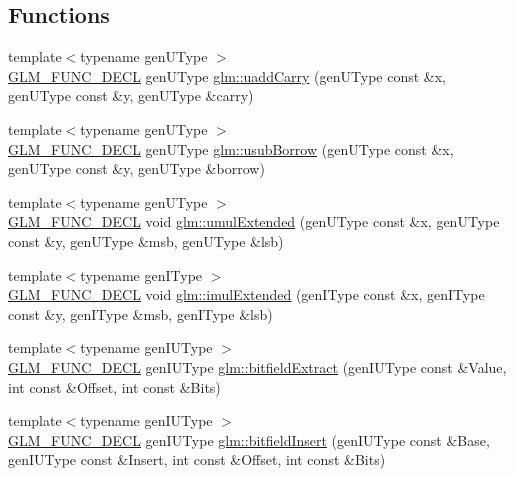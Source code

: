 \subsection*{Functions}
\begin{DoxyCompactItemize}
\item 
{\footnotesize template$<$typename gen\+U\+Type $>$ }\\\hyperlink{setup_8hpp_ab2d052de21a70539923e9bcbf6e83a51}{G\+L\+M\+\_\+\+F\+U\+N\+C\+\_\+\+D\+E\+CL} gen\+U\+Type \hyperlink{group__core__func__integer_ga19276bb7adbe9f0d74515ae49e40b481}{glm\+::uadd\+Carry} (gen\+U\+Type const \&x, gen\+U\+Type const \&y, gen\+U\+Type \&carry)
\item 
{\footnotesize template$<$typename gen\+U\+Type $>$ }\\\hyperlink{setup_8hpp_ab2d052de21a70539923e9bcbf6e83a51}{G\+L\+M\+\_\+\+F\+U\+N\+C\+\_\+\+D\+E\+CL} gen\+U\+Type \hyperlink{group__core__func__integer_gae5b4a6cefd1e21fd2e1b8526b4c964a7}{glm\+::usub\+Borrow} (gen\+U\+Type const \&x, gen\+U\+Type const \&y, gen\+U\+Type \&borrow)
\item 
{\footnotesize template$<$typename gen\+U\+Type $>$ }\\\hyperlink{setup_8hpp_ab2d052de21a70539923e9bcbf6e83a51}{G\+L\+M\+\_\+\+F\+U\+N\+C\+\_\+\+D\+E\+CL} void \hyperlink{group__core__func__integer_gad991bf53779a4309a920bb7bfcf2639c}{glm\+::umul\+Extended} (gen\+U\+Type const \&x, gen\+U\+Type const \&y, gen\+U\+Type \&msb, gen\+U\+Type \&lsb)
\item 
{\footnotesize template$<$typename gen\+I\+Type $>$ }\\\hyperlink{setup_8hpp_ab2d052de21a70539923e9bcbf6e83a51}{G\+L\+M\+\_\+\+F\+U\+N\+C\+\_\+\+D\+E\+CL} void \hyperlink{group__core__func__integer_ga7d284e3ea5059cae9fe8f0fe1a76dd02}{glm\+::imul\+Extended} (gen\+I\+Type const \&x, gen\+I\+Type const \&y, gen\+I\+Type \&msb, gen\+I\+Type \&lsb)
\item 
{\footnotesize template$<$typename gen\+I\+U\+Type $>$ }\\\hyperlink{setup_8hpp_ab2d052de21a70539923e9bcbf6e83a51}{G\+L\+M\+\_\+\+F\+U\+N\+C\+\_\+\+D\+E\+CL} gen\+I\+U\+Type \hyperlink{group__core__func__integer_ga251d309beb171bf95117d2c301b2ad8b}{glm\+::bitfield\+Extract} (gen\+I\+U\+Type const \&Value, int const \&Offset, int const \&Bits)
\item 
{\footnotesize template$<$typename gen\+I\+U\+Type $>$ }\\\hyperlink{setup_8hpp_ab2d052de21a70539923e9bcbf6e83a51}{G\+L\+M\+\_\+\+F\+U\+N\+C\+\_\+\+D\+E\+CL} gen\+I\+U\+Type \hyperlink{group__core__func__integer_ga7ab09972d52094d97d2480982e657dd0}{glm\+::bitfield\+Insert} (gen\+I\+U\+Type const \&Base, gen\+I\+U\+Type const \&Insert, int const \&Offset, int const \&Bits)

\end{DoxyCompactItemize}
